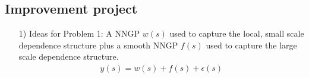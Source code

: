 \documentclass[
12pt, %
a4paper, %
oneside, %
headinclude,footinclude, %
BCOR5mm, %
]{scrartcl}
\begin{document}
\subsection{Improvement project}
\begin{itemize}
 \item [1)] Ideas for Problem 1: A NNGP $w(s)$ used to capture the \textcolor[rgb]{0.50,0.50,0.50}{local, small scale dependence structure} plus a smooth NNGP $f(s)$ used to capture the \textcolor[rgb]{0.50,0.50,0.50}{large scale dependence structure}.
\begin{equation}
\begin{aligned}
y(s) = w(s) + f(s) + \epsilon(s)
\end{aligned} \label{DP1}
\end{equation}
%

\end{itemize}
\end{document}

